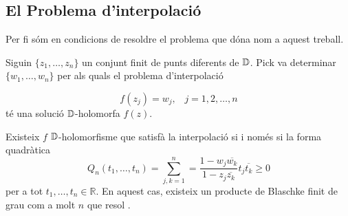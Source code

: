 \documentclass[dvipsnames, svgnames, leqno, a4paper, 12pt]{article}
\begin{document}
\subsection{El Problema d'interpolació}
Per fi sóm en condicions de resoldre el problema que dóna nom a aquest treball.

Siguin $\{z_1,\dots,z_n\}$ un conjunt finit de punts diferents de $\mathbb{D}$. Pick va determinar  $\{w_1,\dots,w_n\}$ per als quals el problema d'interpolació

\begin{equation}\label{eq:interpol}
    f(z_j)=w_j,\, \text{  } j=1,2,\dots,n
\end{equation}
%
té una solució $\mathbb{D}$-holomorfa $f(z)$.

\begin{theorem}[Pick]
    Existeix $f$ $\mathbb{D}$-holomorfisme que satisfà la interpolació \normalfont{(\ref{eq:interpol})} si i només si la forma quadràtica 
    \begin{displaymath}
        Q_n(t_1,\dots,t_n)=\sum_{j,k=1}^n=\frac{1-w_j\overline{w_k}}{1-z_j\overline{z_k}}t_j\overline{t_k}\geq0
    \end{displaymath}
    per a tot $t_1,\dots, t_n\in\mathbb{R}$. En aquest cas, existeix un producte de Blaschke finit de grau com a molt $n$ que resol \normalfont{(\ref{eq:interpol})}.
\end{theorem}
\end{document}
